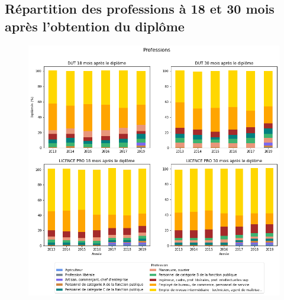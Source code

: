 \documentclass[12pt, a4paper, titlepage, table]{article}
\begin{document}
	\subsection{Répartition des professions à 18 et 30 mois après l'obtention du diplôme}
		\begin{figure}[H]
			\centering
			\includegraphics[width=1\textwidth]{../graphs/repartition_professions_situation_1.png}
			\label{fig:profession_pourcentage_1}
		\end{figure}
	
\end{document}
